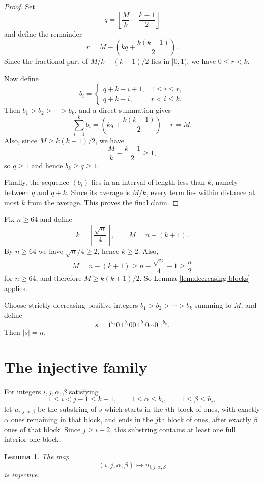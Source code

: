 \documentclass[11pt]{article}
\newtheorem{lemma}[theorem]{Lemma}
\begin{document}
\begin{proof}
Set
\[
q=\left\lfloor \frac{M}{k}-\frac{k-1}{2}\right\rfloor
\]
and define the remainder
\[
r=M-\left(kq+\frac{k(k-1)}{2}\right).
\]
Since the fractional part of $M/k-(k-1)/2$ lies in $[0,1)$, we have $0\le r<k$.

Now define
\[
b_i=
\begin{cases}
q+k-i+1,&1\le i\le r,\\
q+k-i,&r<i\le k.
\end{cases}
\]
Then $b_1>b_2>\cdots>b_k$, and a direct summation gives
\[
\sum_{i=1}^k b_i = \left(kq+\frac{k(k-1)}2\right)+r=M.
\]
Also, since $M\ge k(k+1)/2$, we have
\[
\frac{M}{k}-\frac{k-1}{2}\ge 1,
\]
so $q\ge 1$ and hence $b_k\ge q\ge 1$.

Finally, the sequence $(b_i)$ lies in an interval of length less than $k$, namely between $q$ and $q+k$.  Since its average is $M/k$, every term lies within distance at most $k$ from the average.  This proves the final claim.
\end{proof}

Fix $n\ge 64$ and define
\[
k=\left\lfloor \frac{\sqrt n}{4}\right\rfloor,
\qquad
M=n-(k+1).
\]
By $n\ge 64$ we have $\sqrt n/4\ge 2$, hence $k\ge 2$.  Also,
\[
M=n-(k+1)\ge n-\frac{\sqrt n}{4}-1\ge \frac n2
\]
for $n\ge 64$, and therefore $M\ge k(k+1)/2$.  So Lemma \ref{lem:decreasing-blocks} applies.

Choose strictly decreasing positive integers $b_1>b_2>\cdots>b_k$ summing to $M$, and define
\begin{equation}\label{eq:constructed-string}
s=1^{b_1}0\,1^{b_2}00\,1^{b_3}0\cdots 0\,1^{b_k}.
\end{equation}
Then $|s|=n$.

\section{The injective family}

For integers $i,j,\alpha,\beta$ satisfying
\[
1\le i<j-1\le k-1,
\qquad
1\le \alpha\le b_i,
\qquad
1\le \beta\le b_j,
\]
let $u_{i,j,\alpha,\beta}$ be the substring of $s$ which starts in the $i$th block of ones, with exactly $\alpha$ ones remaining in that block, and ends in the $j$th block of ones, after exactly $\beta$ ones of that block.  Since $j\ge i+2$, this substring contains at least one full interior one-block.

\begin{lemma}\label{lem:injective}
The map
\[
(i,j,\alpha,\beta)\longmapsto u_{i,j,\alpha,\beta}
\]
is injective.
\end{lemma}
\end{document}
